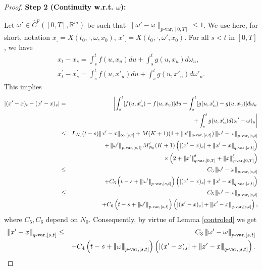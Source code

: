 \documentclass[10pt]{article}
\numberwithin{equation}{section} %
\newcommand{\R}{\ensuremath{\mathbb{R}}}
\newcommand{\ltn}{\ensuremath{\left| \! \left| \! \left|}}
\newcommand{\rtn}{\ensuremath{\right| \! \right| \! \right|}}
\begin{document}
\begin{proof}
{\bf Step 2 (Continuity w.r.t. $\omega$):} \medskip

Let $\omega'\in \widehat{C}^{p}([0,T],\R^m) $ be such that $\|\omega'-\omega\|_{p\text{-var},[0,T]}\leq 1$.  We use here, for short, notation  $x_.=X(t_0,\cdot,\omega, x_0)$, $x'_.=X(t_0,\cdot,\omega', x_0)$. For all $s<t$ in $[0,T]$, we have
\begin{eqnarray*}
x_t-x_s=\int_s^tf(u,x_u)du+\int_s^t g(u,x_u)d\omega_u,\\
x^\prime_t-x^\prime_s=\int_s^tf(u,x'_u)du+\int_s^t g(u,x'_u)d\omega'_u.
\end{eqnarray*}
This implies
\begin{eqnarray*}
|(x'-x)_t-(x'-x)_s|&=&\left|\int_s^t[f(u,x'_u)-f(u,x_u)]du+\int_s^t [g(u,x'_u)-g(u,x_u)]d\omega_u\right .\\
&&\left .+\int_s^t g(u,x'_u)d(\omega'-\omega)_u\right|\\
&\leq &L_{N_0}(t-s)\|x'-x\|_{\infty,[s,t]} +M(K+1)(1+\|x'\|_{q\text{-var},[s,t]})\ltn\omega'-\omega\rtn_{p\text{-var},[s,t]}\\
&& +\ltn\omega'\rtn_{p\text{-var},[s,t]}M_{N_0}'(K+1) \left(|(x'-x)_s|+\ltn x'-x\rtn_{q\text{-var},[s,t]}\right)\\
&&\times\left(2+\ltn x'\rtn^\delta_{q\text{-var},[0,T]}+\ltn x\rtn^\delta_{q\text{-var},[0,T]}\right)\\
&\leq& C_5\ltn\omega'-\omega\rtn_{p\text{-var},[s,t]} \\
&&+ C_6\left(t-s+\ltn\omega'\rtn_{p\text{-var},[s,t]}\right)\left( |(x'-x)_s|+\ltn x'-x\rtn_{q\text{-var},[s,t]}\right)\\
&\leq& C_5\ltn\omega'-\omega\rtn_{p\text{-var},[s,t]} \\
&&+  C_6\left(t-s+\ltn\omega'\rtn_{p\text{-var},[s,t]}\right)\left( |(x'-x)_s|+\ltn x'-x\rtn_{q\text{-var},[s,t]}\right),
\end{eqnarray*}
where $C_5,C_6$ depend on $N_0$. Consequently, by virtue of 
  Lemma \ref{controled} we get 
\begin{eqnarray*}
\ltn x'-x\rtn_{q\text{-var},[s,t]}&\leq& C_3\ltn\omega'-\omega\rtn_{p\text{-var},[s,t]} \\
&&+ C_4\left(t-s+\ltn\omega\rtn_{p\text{-var},[s,t]}\right)\left( |(x'-x)_s|+\ltn x'-x\rtn_{q\text{-var},[s,t]}\right).

\end{eqnarray*}
\end{proof}
\end{document}
